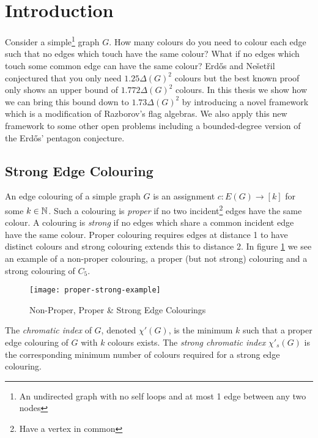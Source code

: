 \chapter*{Introduction}

Consider a simple\footnote{An undirected graph with no self loops and at most 1 edge between any two nodes} graph $G$. How many colours do you need to colour each edge such that no edges which touch
have the same colour? What if no edges which touch some common edge can have the same colour?
Erd\H{o}s and Nešetřil conjectured that you only need $1.25\Delta(G)^2$ colours but
the best known proof only shows an upper bound of $1.772\Delta(G)^2$ colours. In this thesis
we show how we can bring this bound down to $1.73\Delta(G)^2$ by introducing a novel framework
which is a modification of Razborov's flag algebras. We also apply this new framework
to some other open problems including a bounded-degree version of the
Erd\H{o}s' pentagon conjecture.

\section*{Strong Edge Colouring}
\label{sec:intro_strong_edge_coloring}

An edge colouring of a simple graph $G$ is an assignment $c\colon E(G) \to [k]$
for some $k\in\mathbb{N}$. Such a colouring is \textit{proper} if no two incident\footnote{Have a vertex in common}
edges have the same colour.
A colouring is \textit{strong} if no edges which share a common incident edge have
the same colour. Proper colouring requires edges at distance 1 to have distinct
colours and strong colouring extends this to distance 2.
In figure \ref{fig:proper-strong-example} we see an example of a non-proper colouring,
a proper (but not strong) colouring and a strong colouring of $C_5$.

\begin{figure}[h]
    \centering
    \texttt{[image: proper-strong-example]}
    \caption{Non-Proper, Proper \& Strong Edge Colourings}
    \label{fig:proper-strong-example}
\end{figure}

The \textit{chromatic index} of $G$, denoted $\chi'(G)$, is the minimum $k$ such that a proper edge
colouring of $G$ with $k$ colours exists. The \textit{strong chromatic index} $\chi'_s(G)$
is the corresponding minimum number of colours required for a strong edge colouring.

